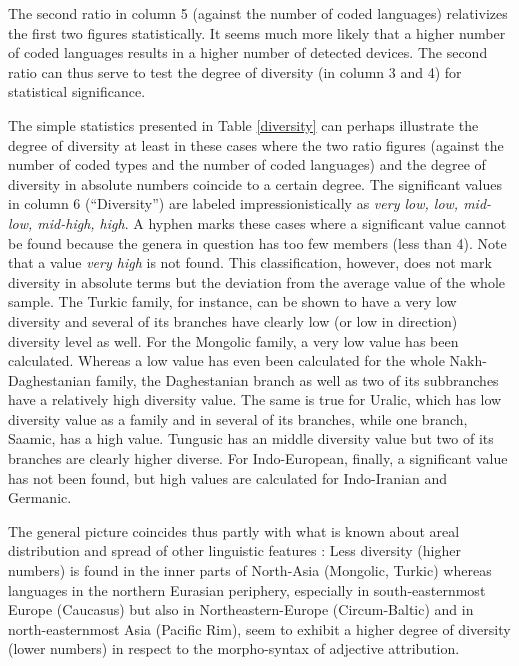 The second ratio in column 5 (against the number of coded languages) relativizes the first two figures statistically. It seems much more likely that a higher number of coded languages results in a higher number of detected devices. The second ratio can thus serve to test the degree of diversity (in column 3 and 4) for statistical significance. 

The simple statistics presented in Table  \ref{diversity} can perhaps illustrate the degree of diversity at least in these cases where the two ratio figures (against the number of coded types and the number of coded languages) and the degree of diversity in absolute numbers coincide to a certain degree. The significant values in column 6 (“Diversity”) are labeled impressionistically as \textit{very low, low, mid-low, mid-high, high}. A hyphen marks these cases where a significant value cannot be found because the genera in question has too few members (less than 4). Note that a value \textit{very high} is not found. This classification, however, does not mark diversity in absolute terms but the deviation from the average value of the whole sample. The Turkic family, for instance,  can be shown to have a very low diversity and several of its branches have clearly low (or low in direction) diversity level as well. For the Mongolic family, a very low value has been calculated. Whereas a low value has even been calculated for the whole Nakh-Daghestanian family, the Daghestanian branch as well as two of its subbranches have a relatively high diversity value. The same is true for Uralic, which has low diversity value as a family and in several of its branches, while one branch, Saamic, has a high value. Tungusic has an middle diversity value but two of its branches are clearly higher diverse. For Indo-European, finally, a significant value has not been found, but high values are calculated for Indo-Iranian and Germanic.

The general picture coincides thus partly with what is known about areal distribution and spread of other linguistic features \citep[cf., e.g.,][]{nichols1992}: Less diversity (higher numbers) is found in the inner parts of North-Asia (Mongolic, Turkic) whereas languages in the northern Eurasian periphery, especially in south-easternmost Europe (Caucasus) but also in Northeastern-Europe (Circum-Baltic) and in north-easternmost Asia (Pacific Rim), seem to exhibit a higher degree of diversity (lower numbers) in respect to the morpho-syntax of adjective attribution.

